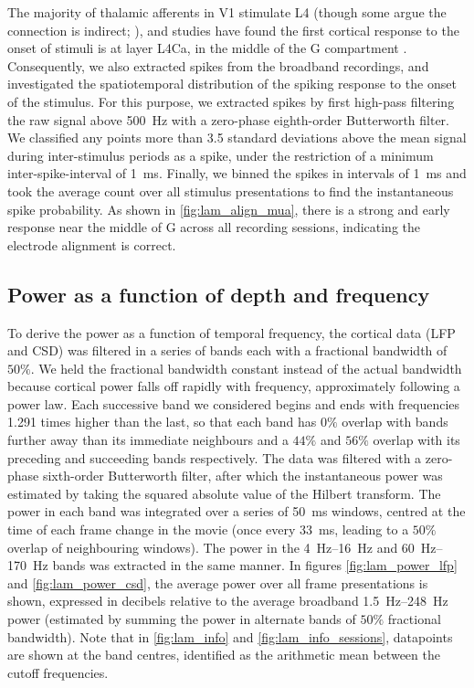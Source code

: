 The majority of thalamic afferents in \ac{V1} stimulate \ac{L4} (though some argue the connection is indirect; \citealp{Hansen2012}), and studies have found the first cortical response to the onset of stimuli is at layer \ac{L4Ca}, in the middle of the \ac{G} compartment \citep{Callaway1998}.
Consequently, we also extracted spikes from the broadband recordings, and investigated the spatiotemporal distribution of the spiking response to the onset of the stimulus.
For this purpose, we extracted spikes by first high-pass filtering the raw signal above \SI{500}{Hz} with a zero-phase eighth-order Butterworth filter.
We classified any points more than \num{3.5} standard deviations above the mean signal during inter-stimulus periods as a spike, under the restriction of a minimum inter-spike-interval of \SI{1}{\milli\second}.
Finally, we binned the spikes in intervals of \SI{1}{\milli\second} and took the average count over all stimulus presentations to find the instantaneous spike probability.
As shown in \autoref{fig:lam_align_mua}, there is a strong and early response near the middle of \ac{G} across all recording sessions, indicating the electrode alignment is correct.


\subsection{Power as a function of depth and frequency}
\label{sec:lam_power_method}

To derive the power as a function of temporal frequency, the cortical data (\ac{LFP} and \ac{CSD}) was filtered in a series of bands each with a fractional bandwidth of $50\%$.
We held the fractional bandwidth constant instead of the actual bandwidth because cortical power falls off rapidly with frequency, approximately following a power law.
Each successive band we considered begins and ends with frequencies \num{1.291} times higher than the last, so that each band has $0\%$ overlap with bands further away than its immediate neighbours and a $44\%$ and $56\%$ overlap with its preceding and succeeding bands respectively.
The data was filtered with a zero-phase sixth-order Butterworth filter, after which the instantaneous power was estimated by taking the squared absolute value of the Hilbert transform.
The power in each band was integrated over a series of \SI{50}{\milli\second} windows, centred at the time of each frame change in the movie (once every \SI{33}{\milli\second}, leading to a $50\%$ overlap of neighbouring windows).
The power in the \SIrange{4}{16}{Hz} and \SIrange{60}{170}{Hz} bands was extracted in the same manner.
In figures \ref{fig:lam_power_lfp} and \ref{fig:lam_power_csd}, the average power over all frame presentations is shown, expressed in decibels relative to the average broadband \SIrange{1.5}{248}{Hz} power (estimated by summing the power in alternate bands of $50\%$ fractional bandwidth).
Note that in \autoref{fig:lam_info} and \autoref{fig:lam_info_sessions}, datapoints are shown at the band centres, identified as the arithmetic mean between the cutoff frequencies.


